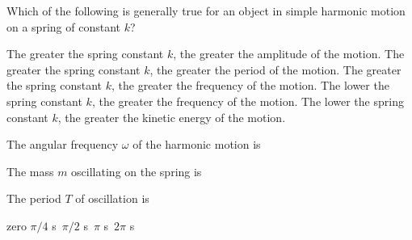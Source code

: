 \documentclass{../../oss-apphys-exam}
\newcounter{lastmc}
\begin{document}
\begin{multicols*}{2}
\begin{questions}
    
    \question Which of the following is generally true for an object in simple
    harmonic motion on a spring of constant $k$?
    \begin{choices}
      \choice The greater the spring constant $k$, the greater the amplitude of
      the motion.
      \choice The greater the spring constant $k$, the greater the period of
      the motion.
      \choice The greater the spring constant $k$, the greater the frequency of
      the motion.
      \choice The lower the spring constant $k$, the greater the frequency of
      the motion.
      \choice The lower the spring constant $k$, the greater the kinetic energy
      of the motion.
    \end{choices}
    \vspace{.55in}
    

    \question The angular frequency $\omega$ of the harmonic motion is
    \label{first}

    \question The mass $m$ oscillating on the spring is
    
    \question The period $T$ of oscillation is
    \begin{choices}
      \choice zero
      \choice $\pi/4$ \si\second
      \choice $\pi/2$ \si\second
      \choice $\pi$ \si\second
      \choice $2\pi$ \si\second
    \end{choices}
    \label{last}   
  \end{questions}
  \setcounter{lastmc}{\value{question}}
\end{multicols*}
\newpage


\end{document}
